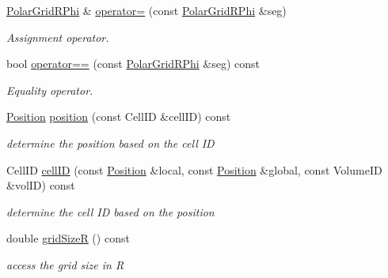 \begin{DoxyCompactItemize}
\hyperlink{class_d_d4hep_1_1_geometry_1_1_polar_grid_r_phi}{PolarGridRPhi} \& \hyperlink{class_d_d4hep_1_1_geometry_1_1_polar_grid_r_phi_a6e176a9943b7b44441376e543b01037a}{operator=} (const \hyperlink{class_d_d4hep_1_1_geometry_1_1_polar_grid_r_phi}{PolarGridRPhi} \&seg)
\begin{DoxyCompactList}\small\item\em Assignment operator. \item\end{DoxyCompactList}\item 
bool \hyperlink{class_d_d4hep_1_1_geometry_1_1_polar_grid_r_phi_ab90c2c089a725998035253e56ecfd0a3}{operator==} (const \hyperlink{class_d_d4hep_1_1_geometry_1_1_polar_grid_r_phi}{PolarGridRPhi} \&seg) const 
\begin{DoxyCompactList}\small\item\em Equality operator. \item\end{DoxyCompactList}\item 
\hyperlink{namespace_d_d4hep_1_1_geometry_a55083902099d03506c6db01b80404900}{Position} \hyperlink{class_d_d4hep_1_1_geometry_1_1_polar_grid_r_phi_a8da3253613f37b1c9c93a2cd88767b0c}{position} (const CellID \&cellID) const 
\begin{DoxyCompactList}\small\item\em determine the position based on the cell ID \item\end{DoxyCompactList}\item 
CellID \hyperlink{class_d_d4hep_1_1_geometry_1_1_polar_grid_r_phi_a406273afad3c872baf560df87f18c85f}{cellID} (const \hyperlink{namespace_d_d4hep_1_1_geometry_a55083902099d03506c6db01b80404900}{Position} \&local, const \hyperlink{namespace_d_d4hep_1_1_geometry_a55083902099d03506c6db01b80404900}{Position} \&global, const VolumeID \&volID) const 
\begin{DoxyCompactList}\small\item\em determine the cell ID based on the position \item\end{DoxyCompactList}\item 
double \hyperlink{class_d_d4hep_1_1_geometry_1_1_polar_grid_r_phi_a2cee7089de4ab9226f8a7f0e81776705}{gridSizeR} () const 
\begin{DoxyCompactList}\small\item\em access the grid size in R \item\end{DoxyCompactList}\item 

\end{DoxyCompactItemize}
